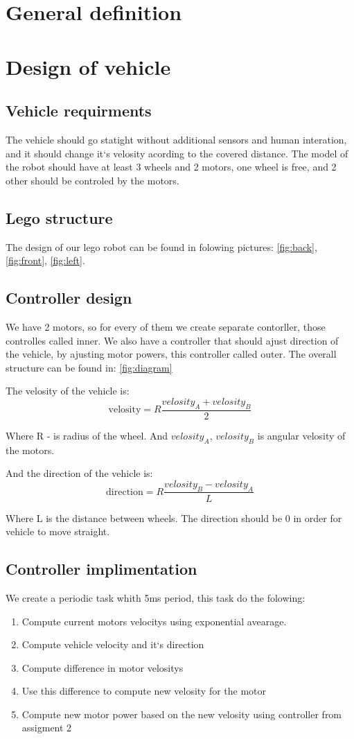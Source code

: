 \documentclass[a4paper,12pt,oneside]{article}
\begin{document}
\section{General definition}


\section{Design of vehicle}
\subsection{Vehicle requirments}
The vehicle should go statight without additional sensors and human interation, and it should change it`s velosity acording to the covered distance. The model of the robot should have at least 3 wheels and 2 motors, one wheel is free, and 2 other should be controled by the motors. 
\subsection{Lego structure}
The design of our lego robot can be found in folowing pictures: \cref{fig:back}, \cref{fig:front}, 
\cref{fig:left}.
\subsection{Controller design}
We have 2 motors, so for every of them we create separate contorller, those controlles called inner. We also have a controller that should ajust direction of the vehicle, by ajusting motor powers, this controller called outer. The overall structure can be found in: \cref{fig:diagram}

The velosity of the vehicle is:
\begin{equation}
\text{velosity} = R \frac{velosity_A + velosity_B}{2} 
\end{equation}

Where R - is radius of the wheel. And $velosity_A$, $velosity_B$ is angular velosity of the motors. 

And the direction of the vehicle is:
\begin{equation}
\text{direction} = R \frac{velosity_B - velosity_A}{L}
\end{equation}

Where L is the distance between wheels. The direction should be 0 in order for vehicle to move straight.


\subsection{Controller implimentation}
We create a periodic task whith 5ms period, this task do the folowing:
\begin{enumerate}
\item Compute current motors velocitys using exponential avearage.
\item Compute vehicle velocity and it`s direction
\item Compute difference in motor velositys
\item Use this difference to compute new velosity for the motor
\item Compute new motor power based on the new velosity using controller from assigment 2
\end{enumerate}
\end{document}
